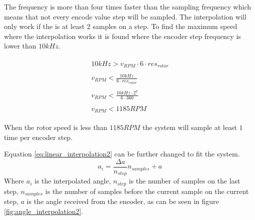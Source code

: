 The frequency is more than four times faster than the sampling frequency which means that not every encode value step will be sampled. The interpolation will only work if the is at least 2 samples on a step. To find the maximum speed where the interpolation works it is found where the encoder step frequency is lower than $10kHz$.

\begin{subequations}
	\begin{align}
    	\begin{split}
        	10kHz > v_{RPM}\cdot 6 \cdot res_{rotor}
    	\end{split} \\ 
    	\begin{split}
        	v_{RPM} < \frac{10kHz}{6 \cdot res_{rotor}}
    	\end{split} \\
    	\begin{split}
        	v_{RPM} < \frac{10kHz \cdot 2^8}{6 \cdot 360}
    	\end{split} \\
    	\begin{split}
        	v_{RPM} < 1185 RPM
    	\end{split} 
	\end{align}
\end{subequations}

When the rotor speed is less than $1185RPM$ the system will sample at least $1$ time per encoder step.

Equation \ref{eq:linear_interpolation2} can be further changed to fit the system.
\begin{equation}
    a_{i} = \frac{\Delta a}{n_{step}} n_{samples} + a
    \label{eq:linear_interpolation3}
\end{equation}
Where $a_{i}$ is the interpolated angle, $n_{step}$ is the number of samples on the last step, $n_{samples}$ is the number of samples before the current sample on the current step, $a$ is the angle received from the encoder, as can be seen in figure \ref{fig:angle_interpolation2}.

